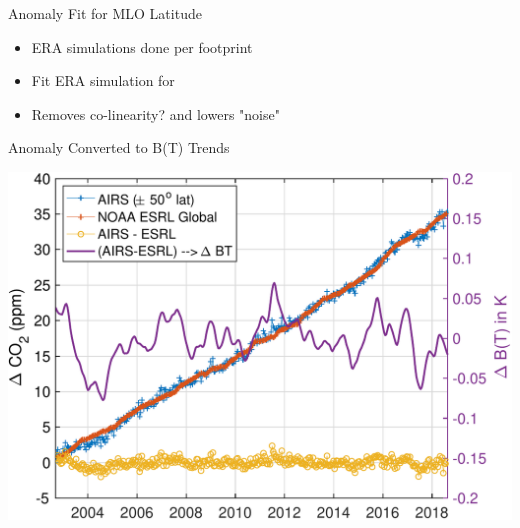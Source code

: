 \documentclass[10pt,t]{beamer}
\begin{document}
\begin{frame}[label={sec:orga1eeb73}]{\cd Anomaly Fit for MLO Latitude}
\begin{footnotesize}
\begin{itemize}
\item ERA simulations done per footprint
\item Fit ERA simulation for \cd
\item Removes co-linearity? and lowers "noise"
\end{itemize}
\end{footnotesize}
\end{frame}

\begin{frame}[label={sec:org028daca}]{\cd Anomaly Converted to B(T) Trends}
\begin{center}
\includegraphics[width=0.7\linewidth]{./Figs/Pdf/co2_airs_vs_esrl_global_with_dbt.pdf}
\end{center}
\end{frame}
\end{document}
